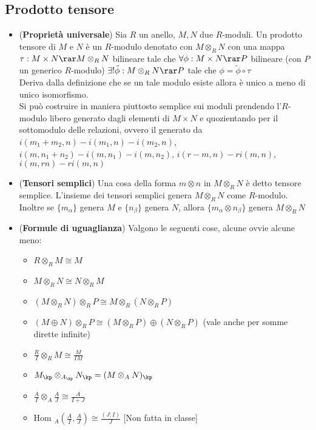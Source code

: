 \documentclass[a4paper,NoNotes,GeneralMath]{stdmdoc}
\newcommand{\Hom}{\text{Hom }}
\begin{document}
	\subsection*{Prodotto tensore}
	\begin{itemize}
		\item ({\bf Proprietà universale}) Sia $R$ un anello, $M, N$ due $R$-moduli. Un prodotto tensore di $M$ e $N$ è un $R$-modulo denotato con $M \otimes_R N$ con una mappa $\tau: M \times N \rar M \otimes_R N$ bilineare tale che $\forall \phi: M \times N \rar P$ bilineare (con $P$ un generico $R$-modulo) $\exists ! \tilde\phi: M \otimes_R N \rar P$ tale che $\phi = \tilde\phi \circ \tau$ \\
		Deriva dalla definizione che se un tale modulo esiste allora è unico a meno di unico isomorfismo. \\
		Si può costruire in maniera piuttosto semplice sui moduli prendendo l'$R$-modulo libero generato dagli elementi di $M \times N$ e quozientando per il sottomodulo delle relazioni, ovvero il generato da $i(m_1+m_2, n) - i(m_1, n) - i(m_2,n)$, $i(m, n_1+n_2) - i(m, n_1) - i(m, n_2)$, $i(r-m, n) - r i(m, n)$, $i(m, rn) - r i (m,n)$
		\item ({\bf Tensori semplici}) Una cosa della forma $m \otimes n$ in $M \otimes_R N$ è detto tensore semplice. L'insieme dei tensori semplici genera $M \otimes_R N$ come $R$-modulo. Inoltre se $\{m_\alpha\}$ genera $M$ e $\{n_\beta\}$ genera $N$, allora $\{m_\alpha \otimes n_\beta\}$ genera $M \otimes_R N$
		\item ({\bf Formule di uguaglianza}) Valgono le seguenti cose, alcune ovvie alcune meno:
			\begin{itemize}
				\item $R \otimes_R M \cong M$
				\item $M \otimes_R N \cong N \otimes_R M$
				\item $(M \otimes_R N) \otimes_R P \cong M \otimes_R (N \otimes_R P)$
				\item $(M \oplus N) \otimes_R P \cong (M \otimes_R P) \oplus (N \otimes_R P)$ (vale anche per somme dirette infinite)
				\item $\frac{R}{I} \otimes_R M \cong \frac{M}{IM}$
				\item $M_\kp \otimes_{A_\kp} N_\kp = (M \otimes_A N)_\kp$
				\item $\frac{A}{I} \otimes_A \frac{A}{J} \cong \frac{A}{I+J}$
				\item $\Hom_A(\frac{A}{I}, \frac{A}{J}) \cong \frac{(J : I)}{J}$ [Non fatta in classe]

\end{itemize}
\end{itemize}
\end{document}
